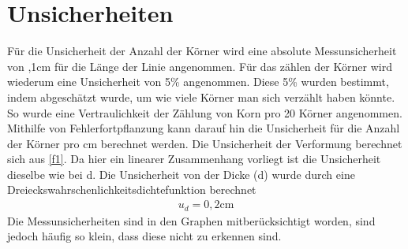 \documentclass[
	a4paper,
	12pt,
	pagesize,
	ngerman
]{scrartcl}
\begin{document}
\section{Unsicherheiten}
Für die Unsicherheit der Anzahl der Körner wird eine absolute Messunsicherheit von ,1cm für die Länge der Linie angenommen. Für das zählen der Körner  wird wiederum eine Unsicherheit von 5\% angenommen. Diese 5\% wurden bestimmt, indem abgeschätzt wurde, um wie viele Körner man sich verzählt haben könnte. So wurde eine Vertraulichkeit der Zählung von  Korn pro 20 Körner angenommen. Mithilfe von Fehlerfortpﬂanzung kann darauf hin die Unsicherheit für die Anzahl der Körner pro cm berechnet werden. 
Die Unsicherheit der Verformung berechnet sich aus \cref{f1}.
Da hier ein linearer Zusammenhang vorliegt ist die Unsicherheit dieselbe wie bei d. Die Unsicherheit von der Dicke (d) wurde durch eine Dreieckswahrschenlichkeitsdichtefunktion berechnet 
\begin{align*}
    u_d = 0,2\text{cm}
\end{align*}
Die Messunsicherheiten sind in den Graphen mitberücksichtigt worden, sind jedoch häufig so klein, dass diese nicht zu erkennen sind.
\end{document}
